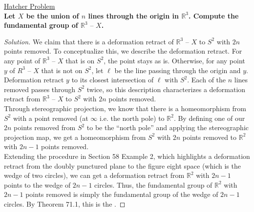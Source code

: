 \documentclass[11pt]{article}
\newcommand{\R}{\mathbb{R}}
\newenvironment{solution}
  {\renewcommand\qedsymbol{$\blacksquare$}\begin{proof}[Solution]}
  {\end{proof}}
\begin{document}
\underline{Hatcher Problem} \\

\textbf{Let $X$ be the union of $n$ lines through the origin in $\R^3$. Compute the fundamental group of $\R^3 \text{ -- } X$.}

\begin{solution}
We claim that there is a deformation retract of $\R^3 \text{ -- } X$ to $S^2$ with $2n$ points removed. To conceptualize this,
we describe the deformation retract. For any point of $\R^3 \text{ -- } X$ that is on $S^2$, the point stays as is. 
Otherwise, for any point $y$ of $R^3 \text{ -- } X$ that is not on $S^2$, let $\ell$ be the line passing through the origin and $y$.
Deformation retract $y$ to its closest intersection of $\ell$ with $S^2$. Each of the $n$ lines removed passes through $S^2$ twice,
so this description characterizes a deformation retract from $\R^3 \text{ -- } X$ to $S^2$ with $2n$ points removed. \\

Through stereographic projection, we know that there is a homeomorphism from $S^2$ with a point removed (at $\infty$ i.e. the north pole) to $\R^2$. 
By defining one of our $2n$ points removed from $S^2$ to be the ``north pole'' and applying the stereographic projection map,
we get a homeomorphism from $S^2$ with $2n$ points removed to $\R^2$ with $2n-1$ points removed. \\

Extending the procedure in Section 58 Example 2, which highlights a deformation retract from the doubly punctured plane to the figure eight space (which is the wedge of two circles),
we can get a deformation retract from $\R^2$ with $2n-1$ points to the wedge of $2n-1$ circles. Thus, the fundamental group of $\R^2$ with $2n-1$ points removed is simply the fundamental group of the wedge of $2n-1$ circles.
By Theorem 71.1, this is the .
\end{solution}

\newpage
\end{document}
